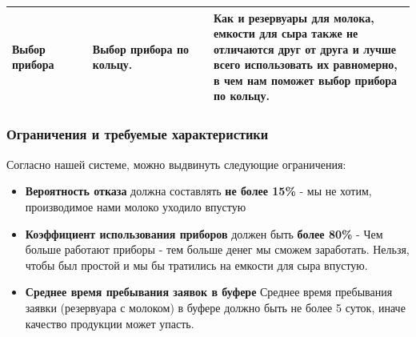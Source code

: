 \documentclass[a4paper, 14pt]{article}
\begin{document}
\begin{center}
\begin{tabular}{|p{0.2\linewidth} | p{0.3\linewidth}| p{0.5\linewidth}|}
		\hline
		Выбор прибора      & Выбор прибора по кольцу.                                                             & Как и резервуары для молока, емкости для сыра также не отличаются друг от друга и лучше всего использовать их \textbf{равномерно}, в чем нам поможет выбор прибора по кольцу.                                                                                                                                                                                                                                                                                                                                                                                                                                                                                  \\
		\hline
	\end{tabular}
\end{center}

\subsubsection{Ограничения и требуемые характеристики}

Согласно нашей системе, можно выдвинуть следующие ограничения:

\begin{itemize}
	\item \textbf{Вероятность отказа} должна составлять \textbf{не более 15\%} - мы не хотим, производимое нами молоко уходило впустую
	\item \textbf{Коэффициент использования приборов} должен быть \textbf{более 80\%} - Чем больше работают приборы - тем больше денег мы сможем заработать. Нельзя, чтобы был простой и мы бы тратились на емкости для сыра впустую.
	\item \textbf{Среднее время пребывания заявок в буфере} Среднее время пребывания заявки (резервуара с молоком) в буфере должно быть не более 5 суток, иначе качество продукции может упасть.
\end{itemize}
\end{document}
